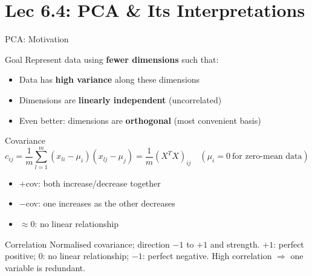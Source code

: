 \documentclass{beamer}
\begin{document}
\section{Lec 6.4: PCA \& Its Interpretations}

\begin{frame}[shrink=10]{PCA: Motivation}
  \begin{block}{Goal}
    Represent data using \textbf{fewer dimensions} such that:
    \begin{itemize}\setlength\itemsep{5pt}
      \item Data has \textbf{high variance} along these dimensions
      \item Dimensions are \textbf{linearly independent} (uncorrelated)
      \item Even better: dimensions are \textbf{orthogonal}
            (most convenient basis)
    \end{itemize}
  \end{block}

  \medskip

  \begin{block}{Covariance}
    \[
      c_{ij}
        = \frac{1}{m}\sum_{l=1}^{m}(x_{li}-\mu_i)(x_{lj}-\mu_j)
        = \frac{1}{m}(X^TX)_{ij}
        \quad(\mu_i=0\ \text{for zero-mean data})
    \]
    \begin{itemize}\setlength\itemsep{4pt}
      \item $+$cov: both increase/decrease together
      \item $-$cov: one increases as the other decreases
      \item $\approx 0$: no linear relationship
    \end{itemize}
  \end{block}

  \begin{exampleblock}{Correlation}
    Normalised covariance; direction $-1$ to $+1$ and strength.
    $+1$: perfect positive; $0$: no linear relationship;
    $-1$: perfect negative.
    High correlation $\Rightarrow$ one variable is redundant.
  \end{exampleblock}
\end{frame}
\end{document}
